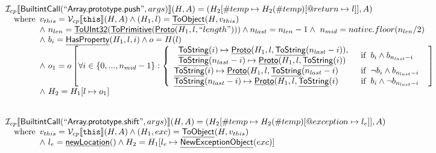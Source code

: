 \documentclass{article}
\makeatletter
\newcommand{\SF}[1]{\mbox{\textsf{#1}}}
\newcommand{\TT}[1]{\mbox{\texttt{#1}}}
\newcommand{\wherec}[1]{{\rm where}\begin{array}[t]{l}#1\end{array}}
\newcommand{\ifc}[1]{{\rm if}\begin{array}[t]{l}#1\end{array}}
\newcommand{\I}{\mathcal{I}}
\newcommand{\V}{\mathcal{V}}
\newcommand{\lbr}{\llbracket}
\newcommand{\rbr}{\rrbracket}
\newcommand{\hf}[1]{\underline{\sf #1}}
\newcommand{\varloc}[1]{\##1}
\newcommand{\varprop}[1]{@#1}
\makeatother
\begin{document}
\[\begin{array}{l}
\I _{cp}\lbr \SF{BuiltintCall}(``\SF{Array.prototype.push}",args)\rbr(H,A)
 = (H_2[\varloc{temp}\mapsto H_2(\varloc{temp})[\varprop{return}\mapsto l]], A) \\
\quad\wherec{
  v_{this} = \V _{cp}\lbr \TT{this}\rbr (H,A) \land (H_1,l) = \hf{ToObject}(H,v_{this})\\
  \land\ n_{len} = \hf{ToUInt32}(\hf{ToPrimitive}(\hf{Proto}(H_1, l, ``length")))
  \land n_{last} = n_{len}-1 \land\ n_{mid} = native.floor(n_{len}/2)\\
  \land\ b_i = \hf{HasProperty}(H_1, l, i) \land o = H(l)\\
  \land\ o_1 = o\left[\forall i \in \{0,...,n_{mid}-1\}: \left\{\begin{array}{ll}
    \begin{array}{l}
      \hf{ToString}(i) \mapsto \hf{Proto}(H_1, l, \hf{ToString}(n_{last} - i)),\\
      \hf{ToString}(n_{last} - i) \mapsto \hf{Proto}(H_1, l,  \hf{ToString}(i))\\
    \end{array}
    & \ifc{b_i \land b_{n_{last} - i} }\\
    \hf{ToString}(i) \mapsto \hf{Proto}(H_1, l, \hf{ToString}(n_{last} - i) 
    & \ifc{\neg b_i \land b_{n_{last} - i} }\\
    \hf{ToString}(n_{last} - i) \mapsto \hf{Proto}(H_1, l,  \hf{ToString}(i)
    & \ifc{b_i \land \neg b_{n_{last} - i} }\\
  \end{array}\right.\right]\\
  \land\ H_2 = H_1[ l \mapsto o_1]\\
  }\\
\\\\



\I _{cp}\lbr \SF{BuiltintCall}(``\SF{Array.prototype.shift}",args)\rbr(H,A)
 = (H_2[\varloc{temp}\mapsto H_2(\varloc{temp})[\varprop{exception}\mapsto l_e]], A) \\
\quad\wherec{
  v_{this} = \V _{cp}\lbr \TT{this}\rbr (H,A) \land (H_1,exc) = \hf{ToObject}(H,v_{this})\\
  \land\ l_e = \hf{newLocation}() \land H_2=H_1[l_e\mapsto\hf{NewExceptionObject}(exc)] 
  }\\
  

\end{array}\]
\end{document}
